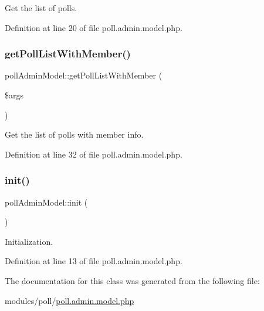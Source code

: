 Get the list of polls. 



Definition at line 20 of file poll.\+admin.\+model.\+php.

\mbox{\label{classpollAdminModel_a5fcc86af506f4a18e0f5c3c0bde0c0e6}} 
\subsubsection{\texorpdfstring{get\+Poll\+List\+With\+Member()}{getPollListWithMember()}}
{\footnotesize\ttfamily poll\+Admin\+Model\+::get\+Poll\+List\+With\+Member (\begin{DoxyParamCaption}\item[{}]{\$args }\end{DoxyParamCaption})}



Get the list of polls with member info. 



Definition at line 32 of file poll.\+admin.\+model.\+php.

\mbox{\label{classpollAdminModel_ab414abeed028a478983ac6f493340e87}} 
\subsubsection{\texorpdfstring{init()}{init()}}
{\footnotesize\ttfamily poll\+Admin\+Model\+::init (\begin{DoxyParamCaption}{ }\end{DoxyParamCaption})}



Initialization. 



Definition at line 13 of file poll.\+admin.\+model.\+php.



The documentation for this class was generated from the following file\+:\begin{DoxyCompactItemize}
\item 
modules/poll/\hyperlink{poll_8admin_8model_8php}{poll.\+admin.\+model.\+php}\end{DoxyCompactItemize}
